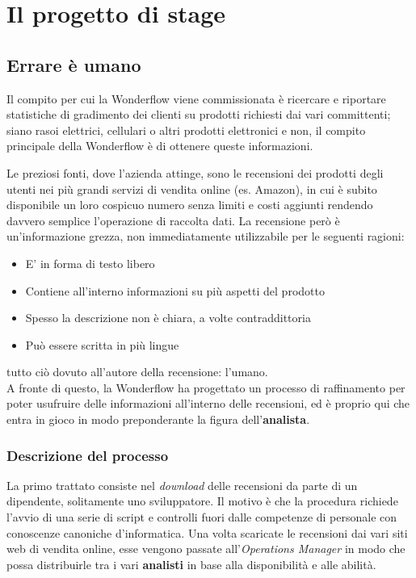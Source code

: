 
\chapter{Il progetto di stage}
\label{cap:progetto-stage}

\section{Errare è umano}
Il compito per cui la Wonderflow viene commissionata è ricercare e riportare
statistiche di gradimento dei clienti su prodotti richiesti dai vari
committenti; siano rasoi elettrici, cellulari o altri prodotti elettronici e
non, il compito principale della Wonderflow è di ottenere queste informazioni.

Le preziosi fonti, dove l'azienda attinge, sono le recensioni dei prodotti
degli utenti nei più grandi servizi di vendita online (es. Amazon), in cui è
subito disponibile un loro cospicuo numero senza limiti e costi aggiunti
rendendo davvero semplice l'operazione di raccolta dati. La recensione
però è un'informazione grezza, non immediatamente utilizzabile per le seguenti
ragioni:
\begin{itemize}
\item E' in forma di testo libero
\item Contiene all'interno informazioni su più aspetti del prodotto
\item Spesso la descrizione non è chiara, a volte contraddittoria
\item Può essere scritta in più lingue
\end{itemize}

tutto ciò dovuto all'autore della recensione: l'umano. \\

A fronte di questo, la Wonderflow ha progettato un processo di raffinamento per
poter usufruire delle informazioni all'interno delle recensioni, ed è proprio
qui che entra in gioco in modo preponderante la figura dell'\textbf{analista}.

\subsection{Descrizione del processo}
La primo trattato consiste nel \textit{download} delle recensioni da parte di
un dipendente, solitamente uno sviluppatore. Il motivo è che la procedura
richiede l'avvio di una serie di \gls{script} e controlli fuori dalle
competenze di personale con conoscenze canoniche d'informatica.
Una volta scaricate le recensioni dai vari siti web di vendita online, esse
vengono passate all'\textit{Operations Manager} in modo che possa distribuirle
tra i vari \textbf{analisti} in base alla disponibilità e alle abilità.

